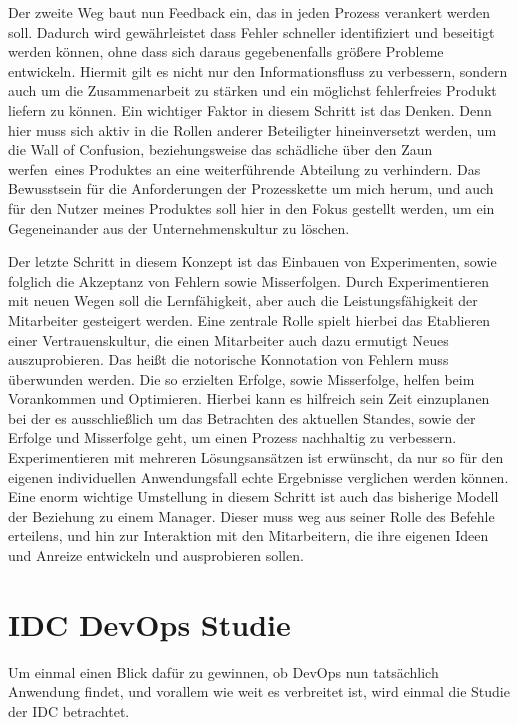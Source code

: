 Der zweite Weg baut nun Feedback ein, das in jeden Prozess verankert werden soll. Dadurch wird gewährleistet dass Fehler schneller identifiziert und beseitigt werden können, ohne dass sich daraus gegebenenfalls größere Probleme entwickeln. Hiermit gilt es nicht nur den Informationsfluss zu verbessern, sondern auch um die Zusammenarbeit zu stärken und ein möglichst fehlerfreies Produkt liefern zu können. Ein wichtiger Faktor in diesem Schritt ist das Denken. Denn hier muss sich aktiv in die Rollen anderer Beteiligter hineinversetzt werden, um die \glqq Wall of Confusion\grqq , beziehungsweise das schädliche \glqq über den Zaun werfen\grqq\ eines Produktes an eine weiterführende Abteilung zu verhindern. Das Bewusstsein für die Anforderungen der Prozesskette um mich herum, und auch für den Nutzer meines Produktes soll hier in den Fokus gestellt werden, um ein Gegeneinander aus der Unternehmenskultur zu löschen.

Der letzte Schritt in diesem Konzept ist das Einbauen von Experimenten, sowie folglich die Akzeptanz von Fehlern sowie Misserfolgen. Durch Experimentieren mit neuen Wegen soll die Lernfähigkeit, aber auch die Leistungsfähigkeit der Mitarbeiter gesteigert werden. Eine zentrale Rolle spielt hierbei das Etablieren einer Vertrauenskultur, die einen Mitarbeiter auch dazu ermutigt Neues auszuprobieren. Das heißt die notorische Konnotation von Fehlern muss überwunden werden. Die so erzielten Erfolge, sowie Misserfolge, helfen beim Vorankommen und Optimieren. Hierbei kann es hilfreich sein Zeit einzuplanen bei der es ausschließlich um das Betrachten des aktuellen Standes, sowie der Erfolge und Misserfolge geht, um einen Prozess nachhaltig zu verbessern. Experimentieren mit mehreren Lösungsansätzen ist erwünscht, da nur so für den eigenen individuellen Anwendungsfall echte Ergebnisse verglichen werden können. Eine enorm wichtige Umstellung in diesem Schritt ist auch das bisherige Modell der Beziehung zu einem Manager. Dieser muss weg aus seiner Rolle des Befehle erteilens, und hin zur Interaktion mit den Mitarbeitern, die ihre eigenen Ideen und Anreize entwickeln und ausprobieren sollen.

\section{IDC DevOps Studie \cite{idc:2020}}

Um einmal einen Blick dafür zu gewinnen, ob \ac{DevOps} nun tatsächlich Anwendung findet, und vorallem wie weit es verbreitet ist, wird einmal die Studie der \ac{IDC} betrachtet. 

